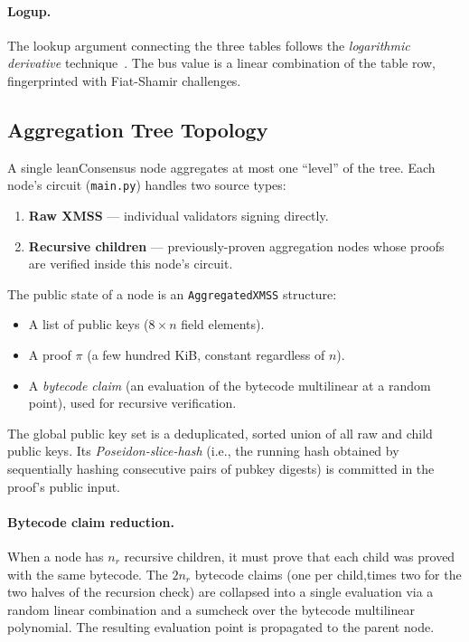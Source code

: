 \documentclass[11pt,a4paper]{article}
\newcommand{\aggsig}{\texttt{AggregatedXMSS}\xspace}
\newcommand{\leanConsensus}{\textsf{leanConsensus}\xspace}
\begin{document}
\paragraph{Logup.}
The lookup argument connecting the three tables follows the \emph{logarithmic derivative} technique~\cite{cryptoeprint:2022/1530}.
The bus value is a linear combination of the table row, fingerprinted with Fiat-Shamir challenges.

\subsection{Aggregation Tree Topology}
\label{subsec:topology}

A single \leanConsensus node aggregates at most one ``level'' of the tree. Each node's circuit (\texttt{main.py}) handles two source types:

\begin{enumerate}
  \item \textbf{Raw XMSS} — individual validators signing directly.
  \item \textbf{Recursive children} — previously-proven aggregation nodes whose proofs are verified inside this node's circuit.
\end{enumerate}

The public state of a node is an \aggsig structure:
\begin{itemize}[noitemsep]
  \item A list of public keys ($8 \times n$ field elements).
  \item A proof $\pi$ (a few hundred KiB, constant regardless of $n$).
  \item A \emph{bytecode claim} (an evaluation of the bytecode multilinear at a random point), used for recursive verification.
\end{itemize}

The global public key set is a deduplicated, sorted union of all raw and child public keys. Its \emph{Poseidon-slice-hash} (i.e., the running hash obtained by sequentially hashing consecutive pairs of pubkey digests) is committed in the proof's public input.

\paragraph{Bytecode claim reduction.}
When a node has $n_r$ recursive children, it must prove that each child was proved with the same bytecode.
The $2n_r$ bytecode claims (one per child,times two for the two halves of the recursion check) are collapsed into a single evaluation via a random linear combination and a sumcheck over the bytecode multilinear polynomial.
The resulting evaluation point is propagated to the parent node.
\end{document}
